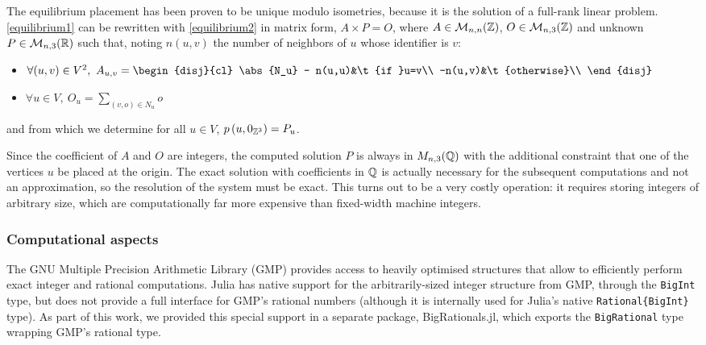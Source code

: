 \documentclass[main.tex]{subfiles}
\begin{document}
The equilibrium placement has been proven to be unique modulo isometries, because it is the solution of a full-rank linear problem\autocite{barycentric}.
\autoref{equilibrium1} can be rewritten with \autoref{equilibrium2} in matrix form, $A\times P = O$, where $A\in\mathcal{M}_{n,n}(\mathbb{Z})$, $O\in\mathcal{M}_{n,3}(\mathbb{Z})$ and unknown $P\in\mathcal{M}_{n,3}(\mathbb{R})$ such that, noting $n(u,v)$ the number of neighbors of $u$ whose identifier is $v$:
\begin{itemize}[noitemsep]
	\item $\forall (u,v)\in V^2,\ A_{u,v} = \begin{disj}{cl}
		\abs{N_u} - n(u,u)&\t{if }u=v\\
		-n(u,v)&\t{otherwise}\\
	\end{disj}$%
	\item $\forall u\in V,\ O_u = \sum\limits_{(v,o)\in N_u}o$
\end{itemize}
and from which we determine for all $u\in V$, $p\left(u, 0_{\mathbb{Z}^3}\right) = P_u$.

Since the coefficient of $A$ and $O$ are integers, the computed solution $P$ is always in $M_{n,3}(\mathbb{Q})$ with the additional constraint that one of the vertices $u$ be placed at the origin. The exact solution with coefficients in $\mathbb{Q}$ is actually necessary for the subsequent computations and not an approximation, so the resolution of the system must be exact. This turns out to be a very costly operation: it requires storing integers of arbitrary size, which are computationally far more expensive than fixed-width machine integers.

\subsubsection{Computational aspects}

The GNU Multiple Precision Arithmetic Library (GMP) \autocite{GMP} provides access to heavily optimised structures that allow to efficiently perform exact integer and rational computations. Julia has native support for the arbitrarily-sized integer structure from GMP, through the \texttt{BigInt} type, but does not provide a full interface for GMP's rational numbers (although it is internally used for Julia's native \texttt{Rational\{BigInt\}} type). As part of this work, we provided this special support in a separate package, BigRationals.jl, which exports the \texttt{BigRational} type wrapping GMP's rational type.
\end{document}
